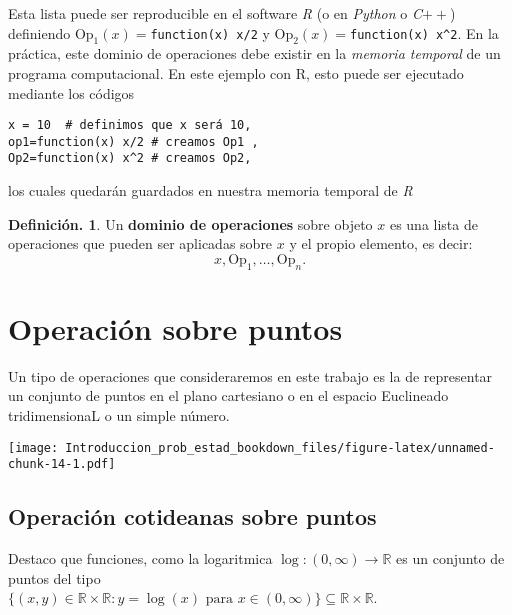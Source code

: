 \documentclass[]{book}
\theoremstyle{definition}
\newtheorem{definition}{Definición.}[chapter]
\theoremstyle{definition}
\theoremstyle{definition}
\theoremstyle{remark}
\begin{document}
Esta lista puede ser reproducible en el software \emph{R} (o en
\emph{Python} o \emph{C}\(++\)) definiendo \(\mbox{Op}_1(x)=\)\texttt{function(x)\ x/2} y \(\mbox{Op}_2(x)=\)\texttt{function(x)\ x\^{}2}. En la práctica, este
dominio de operaciones debe existir en la \emph{memoria temporal} de un
programa computacional. En este ejemplo con R, esto puede ser
ejecutado mediante los códigos

\begin{verbatim}
x = 10  # definimos que x será 10,
op1=function(x) x/2 # creamos Op1 ,  
Op2=function(x) x^2 # creamos Op2,
\end{verbatim}

los cuales quedarán guardados en nuestra memoria temporal de \emph{R}

\begin{definition}
\protect\hypertarget{def:unnamed-chunk-13}{}{\label{def:unnamed-chunk-13} }Un \textbf{dominio de operaciones} sobre objeto \(x\) es una lista de
operaciones que pueden ser aplicadas sobre \(x\) y el propio
elemento, es decir:
\[ x, \mbox{Op}_1, \ldots, \mbox{Op}_n. \]
\end{definition}

\hypertarget{operaciuxf3n-sobre-puntos}{%
\section*{Operación sobre puntos}\label{operaciuxf3n-sobre-puntos}}

Un tipo de operaciones que consideraremos en este trabajo es la de
representar un conjunto de puntos en el plano cartesiano o en el
espacio Euclineado tridimensionaL o un simple número.

\texttt{[image: Introduccion\_prob\_estad\_bookdown\_files/figure-latex/unnamed-chunk-14-1.pdf]}

\hypertarget{operaciuxf3n-cotideanas-sobre-puntos}{%
\subsection*{Operación cotideanas sobre puntos}\label{operaciuxf3n-cotideanas-sobre-puntos}}

Destaco que funciones, como
la logaritmica \(\log: (0,\infty) \to \mathbb{R}\) es un
conjunto de puntos del tipo\\
\(\{(x,y)\in \mathbb{R}\times \mathbb{R}: y=\log(x) \mbox{ para } x\in (0,\infty) \} \subseteq \mathbb{R} \times \mathbb{R}\).
\end{document}
